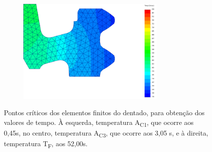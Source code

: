 \begin{figure}[htb]
\begin{subfigure}{.33\textwidth}
        \caption{}
        \label{fig:A1_Dent}
    \end{subfigure}
    \begin{subfigure}{.33\textwidth}
        \centering
        \includegraphics[width = 0.8\textwidth]{Figures/Cap4/TF_Dentado.png}
        \caption{}
        \label{fig:Tf_Dent}
    \end{subfigure}
    \caption[Pontos críticos dos elementos finitos do dentado]%
    {Pontos críticos dos elementos finitos do dentado, para obtenção dos valores de tempo. À esquerda, temperatura A\textsubscript{C1}, que ocorre aos 0,45s, no centro, temperatura A\textsubscript{C3}, que ocorre aos 3,05 s, e à direita, temperatura T\textsubscript{F}, aos 52,00s.}
    \label{fig:Dentado}
\end{figure}
